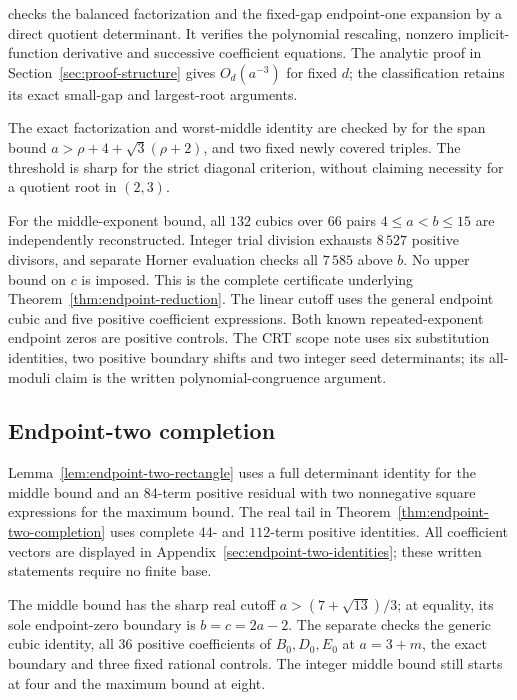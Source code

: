  checks the balanced factorization
and the fixed-gap endpoint-one expansion by a direct quotient determinant.
It verifies the polynomial rescaling, nonzero implicit-function derivative
and successive coefficient equations. The analytic proof in
Section~\ref{sec:proof-structure} gives $O_d(a^{-3})$ for fixed $d$;
the classification retains its exact small-gap and largest-root arguments.

The exact factorization and worst-middle identity are checked by
 for the span bound
$a>\rho+4+\sqrt3(\rho+2)$, and two fixed newly covered triples.
The threshold is sharp for the strict diagonal criterion, without
claiming necessity for a quotient root in $(2,3)$.

For the middle-exponent bound, all $132$ cubics over $66$ pairs
$4\leq a<b\leq15$ are independently reconstructed. Integer trial division
exhausts $8\,527$ positive divisors, and separate Horner evaluation checks
all $7\,585$ above $b$. No upper bound on $c$ is imposed. This is the
complete certificate underlying Theorem~\ref{thm:endpoint-reduction}.
The linear cutoff uses the general endpoint cubic and five positive
coefficient expressions. Both known repeated-exponent endpoint zeros are
positive controls. The CRT scope note uses six substitution identities,
two positive boundary shifts and two integer seed determinants; its
all-moduli claim is the written polynomial-congruence argument.

\subsection{Endpoint-two completion}

Lemma~\ref{lem:endpoint-two-rectangle} uses a full determinant identity
for the middle bound and an $84$-term positive residual with two
nonnegative square expressions for the maximum bound. The real tail in
Theorem~\ref{thm:endpoint-two-completion} uses complete $44$- and
$112$-term positive identities. All coefficient vectors are displayed in
Appendix~\ref{sec:endpoint-two-identities}; these written statements
require no finite base.

The middle bound has the sharp real cutoff $a>(7+\sqrt{13})/3$;
at equality, its sole endpoint-zero boundary is $b=c=2a-2$.
The separate  checks
the generic cubic identity, all $36$ positive coefficients of $B_0,D_0,E_0$
at $a=3+m$, the exact boundary and three fixed rational controls.
The integer middle bound still starts at four and the maximum bound at eight.


